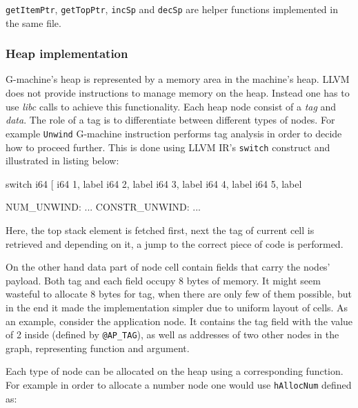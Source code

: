 \documentclass[12pt,a4paper]{report}
\begin{document}
\texttt{getItemPtr}, \texttt{getTopPtr}, \texttt{incSp} and \texttt{decSp} are
helper functions implemented in the same file.


\subsubsection{Heap implementation}
G-machine's heap is represented by a memory area in the machine's heap. LLVM
does not provide instructions to manage memory on the heap. Instead one has to
use \textit{libc} calls to achieve this functionality. Each heap node consist
of a \textit{tag} and \textit{data}. The role of a tag is to differentiate
between different types of nodes. For example \texttt{Unwind} G-machine
instruction performs tag analysis in order to decide how to proceed further.
This is done using LLVM IR's \texttt{switch} construct and illustrated in
listing below:

\vspace*{0.2in}
\begin{code}[style=assembler]

  switch i64 %
      [ i64 1, label %
        i64 2, label %
        i64 3, label %
        i64 4, label %
        i64 5, label %

  NUM_UNWIND:
  ...
  CONSTR_UNWIND:
  ...
\end{code}

Here, the top stack element is fetched first, next the tag of current cell is
retrieved and depending on it, a jump to the correct piece of code is
performed.

On the other hand data part of node cell contain fields that carry the nodes'
payload. Both tag and each field occupy 8 bytes of memory. It might seem
wasteful to allocate 8 bytes for tag, when there are only few of them possible,
but in the end it made the implementation simpler due to uniform layout of
cells. As an example, consider the application node. It contains the tag
field with the value of 2 inside (defined by \texttt{@AP\_TAG}), as well as
addresses of two other nodes in the graph, representing function and argument.

Each type of node can be allocated on the heap using a corresponding function.
For example in order to allocate a number node one would use \texttt{hAllocNum}
defined as:

\vspace*{0.2in}
\end{document}
